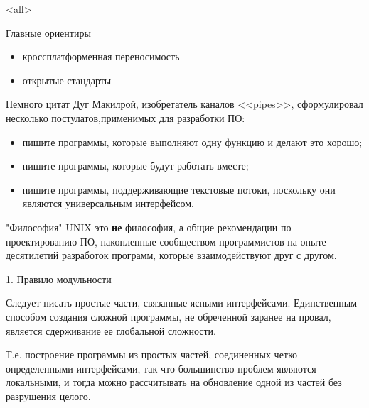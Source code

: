 

\subtitle{Принципы проектирования переносимых программ}



\mode<all>{}

%
%

\begin{frame}{Главные ориентиры}
	\begin{itemize}
		\item кроссплатформенная переносимость
			\pause
		\item открытые стандарты
	\end{itemize}
\end{frame}

\begin{frame}{Немного цитат}
Дуг Макилрой, изобретатель каналов <<pipes>>, сформулировал несколько постулатов,применимых для разработки ПО:
\pause
	\begin{itemize}
		\item пишите программы,  которые выполняют одну функцию и делают это хорошо;
			\pause
		\item пишите программы,  которые будут работать вместе;
			\pause
		\item пишите программы,  поддерживающие текстовые потоки,  поскольку они являются универсальным интерфейсом.
	\end{itemize}

\end{frame}


\begin{frame}{"Философия" UNIX}
	это {\bfseries не} философия,  а общие рекомендации по проектированию ПО,  накопленные сообществом программистов на опыте десятилетий разработок программ,  которые взаимодействуют друг с другом.
\end{frame}

\begin{frame}{1. Правило модульности}
	\begin{block}{Следует писать простые части,  связанные ясными интерфейсами.}
		\pause
Единственным способом создания сложной программы,  не обреченной заранее на провал,  является сдерживание ее глобальной сложности.
	\end{block}
	\pause
Т.е. построение программы из простых частей, соединенных четко определенными интерфейсами, 
так что большинство проблем являются локальными, 
и тогда можно рассчитывать на обновление одной из частей без разрушения целого.
\end{frame}

